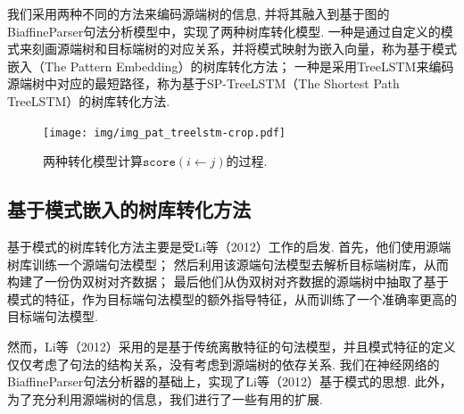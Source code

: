 我们采用两种不同的方法来编码源端树的信息, 并将其融入到基于图的BiaffineParser句法分析模型中，实现了两种树库转化模型.
一种是通过自定义的模式来刻画源端树和目标端树的对应关系，并将模式映射为嵌入向量，称为基于模式嵌入（The Pattern Embedding）的树库转化方法；
一种是采用TreeLSTM来编码源端树中对应的最短路径，称为基于SP-TreeLSTM（The Shortest Path TreeLSTM）的树库转化方法.
\begin{figure}[tb!]

    \centering
    \texttt{[image: img/img\_pat\_treelstm-crop.pdf]}
    \caption{两种转化模型计算$\texttt{score}(i \leftarrow j)$的过程. }
    \label{fig:conversion_models}
\end{figure}

\subsection{基于模式嵌入的树库转化方法}
基于模式的树库转化方法主要是受Li等（2012）工作的启发. 首先，他们使用源端树库训练一个源端句法模型；
然后利用该源端句法模型去解析目标端树库，从而构建了一份伪双树对齐数据；
最后他们从伪双树对齐数据的源端树中抽取了基于模式的特征，作为目标端句法模型的额外指导特征，从而训练了一个准确率更高的目标端句法模型.

然而，Li等（2012）采用的是基于传统离散特征的句法模型，并且模式特征的定义仅仅考虑了句法的结构关系，没有考虑到源端树的依存关系.
我们在神经网络的BiaffineParser句法分析器的基础上，实现了Li等（2012）基于模式的思想. 此外，为了充分利用源端树的信息，我们进行了一些有用的扩展.

